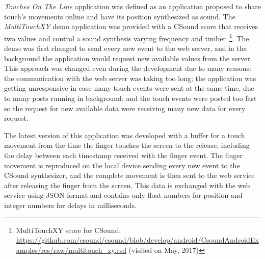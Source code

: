 \textit{Touches On The Line} application was defined as an application proposed to share touch's movements online and have its position synthesized as sound.
The \textit{MultiTouchXY} demo application was provided with a CSound score that receives two values and control a sound synthesis varying frequency and timber~\footnote{MultiTouchXY score for CSound: \url{https://github.com/csound/csound/blob/develop/android/CsoundAndroidExamples/res/raw/multitouch_xy.csd} (visited on May, 2017)}.
The demo was first changed to send every new event to the web server, and in the background the application would request new available values from the server.
This approach was changed even during the development due to many reasons: the communication with the web server was taking too long; the application was getting
unresponsive in case many touch events were sent at the same time, due to many posts running in background;
and the touch events were posted too fast so the request for new available data were receiving many new data for every request.


The latest version of this application was developed with a buffer for a touch movement from the time the finger touches the screen to the release, including the delay between each timestamp received with the finger event.
The finger movement is reproduced on the local device sending every new event to the CSound synthesizer, and the complete movement is then sent to the web service after releasing the finger from the screen.
This data is exchanged with the web service using JSON format and contains only float numbers for position and integer numbers for delays in milliseconds.

